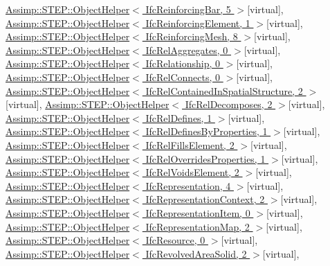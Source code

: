 \hyperlink{struct_assimp_1_1_s_t_e_p_1_1_object_helper}{Assimp\+::\+S\+T\+E\+P\+::\+Object\+Helper$<$ Ifc\+Reinforcing\+Bar, 5 $>$}{\ttfamily  \mbox{[}virtual\mbox{]}}, \hyperlink{struct_assimp_1_1_s_t_e_p_1_1_object_helper}{Assimp\+::\+S\+T\+E\+P\+::\+Object\+Helper$<$ Ifc\+Reinforcing\+Element, 1 $>$}{\ttfamily  \mbox{[}virtual\mbox{]}}, \hyperlink{struct_assimp_1_1_s_t_e_p_1_1_object_helper}{Assimp\+::\+S\+T\+E\+P\+::\+Object\+Helper$<$ Ifc\+Reinforcing\+Mesh, 8 $>$}{\ttfamily  \mbox{[}virtual\mbox{]}}, \hyperlink{struct_assimp_1_1_s_t_e_p_1_1_object_helper}{Assimp\+::\+S\+T\+E\+P\+::\+Object\+Helper$<$ Ifc\+Rel\+Aggregates, 0 $>$}{\ttfamily  \mbox{[}virtual\mbox{]}}, \hyperlink{struct_assimp_1_1_s_t_e_p_1_1_object_helper}{Assimp\+::\+S\+T\+E\+P\+::\+Object\+Helper$<$ Ifc\+Relationship, 0 $>$}{\ttfamily  \mbox{[}virtual\mbox{]}}, \hyperlink{struct_assimp_1_1_s_t_e_p_1_1_object_helper}{Assimp\+::\+S\+T\+E\+P\+::\+Object\+Helper$<$ Ifc\+Rel\+Connects, 0 $>$}{\ttfamily  \mbox{[}virtual\mbox{]}}, \hyperlink{struct_assimp_1_1_s_t_e_p_1_1_object_helper}{Assimp\+::\+S\+T\+E\+P\+::\+Object\+Helper$<$ Ifc\+Rel\+Contained\+In\+Spatial\+Structure, 2 $>$}{\ttfamily  \mbox{[}virtual\mbox{]}}, \hyperlink{struct_assimp_1_1_s_t_e_p_1_1_object_helper}{Assimp\+::\+S\+T\+E\+P\+::\+Object\+Helper$<$ Ifc\+Rel\+Decomposes, 2 $>$}{\ttfamily  \mbox{[}virtual\mbox{]}}, \hyperlink{struct_assimp_1_1_s_t_e_p_1_1_object_helper}{Assimp\+::\+S\+T\+E\+P\+::\+Object\+Helper$<$ Ifc\+Rel\+Defines, 1 $>$}{\ttfamily  \mbox{[}virtual\mbox{]}}, \hyperlink{struct_assimp_1_1_s_t_e_p_1_1_object_helper}{Assimp\+::\+S\+T\+E\+P\+::\+Object\+Helper$<$ Ifc\+Rel\+Defines\+By\+Properties, 1 $>$}{\ttfamily  \mbox{[}virtual\mbox{]}}, \hyperlink{struct_assimp_1_1_s_t_e_p_1_1_object_helper}{Assimp\+::\+S\+T\+E\+P\+::\+Object\+Helper$<$ Ifc\+Rel\+Fills\+Element, 2 $>$}{\ttfamily  \mbox{[}virtual\mbox{]}}, \hyperlink{struct_assimp_1_1_s_t_e_p_1_1_object_helper}{Assimp\+::\+S\+T\+E\+P\+::\+Object\+Helper$<$ Ifc\+Rel\+Overrides\+Properties, 1 $>$}{\ttfamily  \mbox{[}virtual\mbox{]}}, \hyperlink{struct_assimp_1_1_s_t_e_p_1_1_object_helper}{Assimp\+::\+S\+T\+E\+P\+::\+Object\+Helper$<$ Ifc\+Rel\+Voids\+Element, 2 $>$}{\ttfamily  \mbox{[}virtual\mbox{]}}, \hyperlink{struct_assimp_1_1_s_t_e_p_1_1_object_helper}{Assimp\+::\+S\+T\+E\+P\+::\+Object\+Helper$<$ Ifc\+Representation, 4 $>$}{\ttfamily  \mbox{[}virtual\mbox{]}}, \hyperlink{struct_assimp_1_1_s_t_e_p_1_1_object_helper}{Assimp\+::\+S\+T\+E\+P\+::\+Object\+Helper$<$ Ifc\+Representation\+Context, 2 $>$}{\ttfamily  \mbox{[}virtual\mbox{]}}, \hyperlink{struct_assimp_1_1_s_t_e_p_1_1_object_helper}{Assimp\+::\+S\+T\+E\+P\+::\+Object\+Helper$<$ Ifc\+Representation\+Item, 0 $>$}{\ttfamily  \mbox{[}virtual\mbox{]}}, \hyperlink{struct_assimp_1_1_s_t_e_p_1_1_object_helper}{Assimp\+::\+S\+T\+E\+P\+::\+Object\+Helper$<$ Ifc\+Representation\+Map, 2 $>$}{\ttfamily  \mbox{[}virtual\mbox{]}}, \hyperlink{struct_assimp_1_1_s_t_e_p_1_1_object_helper}{Assimp\+::\+S\+T\+E\+P\+::\+Object\+Helper$<$ Ifc\+Resource, 0 $>$}{\ttfamily  \mbox{[}virtual\mbox{]}}, \hyperlink{struct_assimp_1_1_s_t_e_p_1_1_object_helper}{Assimp\+::\+S\+T\+E\+P\+::\+Object\+Helper$<$ Ifc\+Revolved\+Area\+Solid, 2 $>$}{\ttfamily  \mbox{[}virtual\mbox{]}}, 